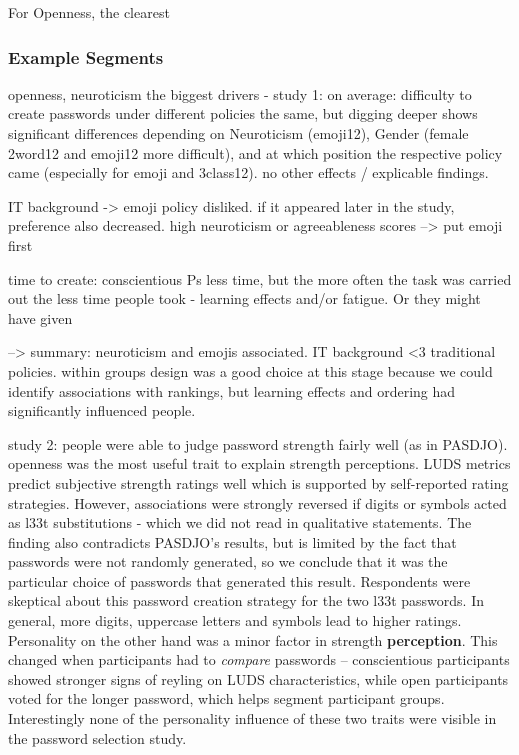 For Openness, the clearest 





\subsubsection{Example Segments}

openness, neuroticism the biggest drivers - 
study 1:
on average: difficulty to create passwords under different policies the same, but digging deeper shows significant differences depending on Neuroticism (emoji12), Gender (female 2word12 and emoji12 more difficult), and at which position the respective policy came (especially for emoji and 3class12). no other effects / explicable findings.

IT background -> emoji policy disliked. if it appeared later in the study, preference also decreased. high neuroticism or agreeableness scores --> put emoji first

time to create: conscientious Ps less time, but the more often the task was carried out the less time people took - learning effects and/or fatigue. Or they might have given 

--> summary: neuroticism and emojis associated. IT background <3 traditional policies. within groups design was a good choice at this stage because we could identify associations with rankings, but learning effects and ordering had significantly influenced people. 

study 2: 
people were able to judge password strength fairly well (as in PASDJO). openness was the most useful trait to explain strength perceptions. LUDS metrics predict subjective strength ratings well which is supported by self-reported rating strategies. However, associations were strongly reversed if digits or symbols acted as l33t substitutions - which we did not read in qualitative statements. The finding also contradicts PASDJO's results, but is limited by the fact that passwords were not randomly generated, so we conclude that it was the particular choice of passwords that generated this result. Respondents were skeptical about this password creation strategy for the two l33t passwords. In general, more digits, uppercase letters and symbols lead to higher ratings. Personality on the other hand was a minor factor in strength \textbf{perception}. This changed when participants had to \textit{compare} passwords -- conscientious participants showed stronger signs of reyling on LUDS characteristics, while open participants voted for the longer password, which helps segment participant groups. 
Interestingly none of the personality influence of these two traits were visible in the password selection study.

